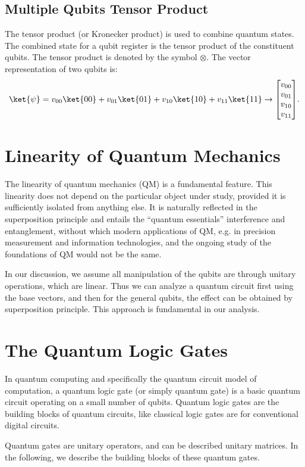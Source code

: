 \subsection{Multiple Qubits Tensor Product}
The tensor product (or Kronecker product) is used to combine quantum states. The combined state for a qubit register is the tensor product of the constituent qubits. The tensor product is denoted by the symbol 
\(\otimes\).
The vector representation of two qubits is:
\[
\ket{\psi} = v_{00}\ket{00} + v_{01}\ket{01} + v_{10}\ket{10} + v_{11}\ket{11}
\rightarrow {\begin{bmatrix}v_{00}\\v_{01}\\v_{10}\\v_{11}\end{bmatrix}}.
\]

\section{Linearity of Quantum Mechanics}
The linearity of quantum mechanics (QM) is a fundamental feature. This linearity does not depend on the particular object under study, provided it is sufficiently isolated from anything else. It is naturally reflected in the superposition principle and entails the “quantum essentials” interference and entanglement, without which modern applications of QM, e.g. in precision measurement and information technologies, and the ongoing study of the foundations of QM would not be the same.

In our discussion, we assume all manipulation of the qubits are through unitary operations, which are linear. Thus we can analyze a quantum circuit first using the base vectors, and then for the general qubits, the effect can be obtained by superposition principle. This approach is fundamental in our analysis. 

\section{The Quantum Logic Gates}
In quantum computing and specifically the quantum circuit model of computation, a quantum logic gate (or simply quantum gate) is a basic quantum circuit operating on a small number of qubits. Quantum logic gates are the building blocks of quantum circuits, like classical logic gates are for conventional digital circuits.

Quantum gates are unitary operators, and can be described unitary matrices. In the following, we describe the building blocks of these quantum gates.

